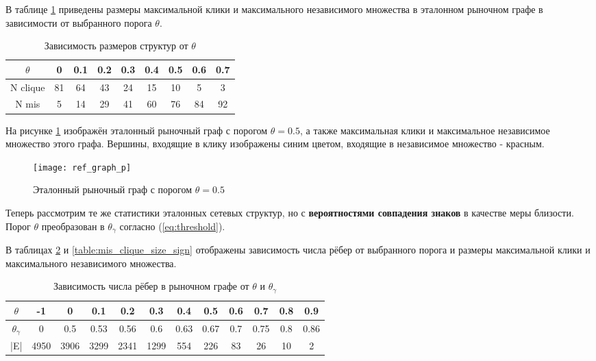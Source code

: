 В таблице \ref{table:mis_clique_size} приведены размеры максимальной клики и максимального независимого множества в эталонном рыночном графе в зависимости от выбранного порога $\theta$.

\begin{table}[h!]
\centering
\begin{tabular}{ |c|c|c|c|c|c|c|c|c| } 
 \hline
 $\theta$ & 0 & 0.1 & 0.2 & 0.3 & 0.4 & 0.5 & 0.6 & 0.7 \\ 
 \hline
 N clique & 81 & 64 & 43 & 24 & 15 & 10 & 5 & 3\\ 
 \hline
 N mis    & 5  & 14 & 29 & 41 & 60 & 76 & 84 & 92\\ 
 \hline
\end{tabular}
\caption{Зависимость размеров структур от $\theta$}
\label{table:mis_clique_size}
\end{table}

На рисунке \ref{fig:ref_graph_p} изображён эталонный рыночный граф с порогом $\theta=0.5$, а также максимальная клики и максимальное независимое множество этого графа. Вершины, входящие в клику изображены синим цветом, входящие в независимое множество - красным.

\begin{figure}[H]
\centering
\texttt{[image: ref\_graph\_p]}
\caption{Эталонный рыночный граф с порогом $\theta=0.5$}
\label{fig:ref_graph_p}
\end{figure}



Теперь рассмотрим те же статистики эталонных сетевых структур, но с\textbf{ вероятностями совпадения знаков} в качестве меры близости. Порог $\theta$ преобразован в $\theta_\gamma$ согласно (\ref{eq:threshold}). 

В таблицах \ref{table:mg_size_sign} и \ref{table:mis_clique_size_sign} отображены зависимость числа рёбер от выбранного порога и  размеры максимальной клики и максимального независимого множества.

\begin{table}[h!]
\centering
\begin{tabular}{ |c|c|c|c|c|c|c|c|c|c|c|c| } 
 \hline
 $\theta$ & -1 & 0 & 0.1 & 0.2 & 0.3 & 0.4 & 0.5 & 0.6 & 0.7 & 0.8 & 0.9 \\ 
 \hline
  $\theta_\gamma$ & 0 & 0.5 & 0.53 & 0.56 & 0.6 & 0.63 & 0.67 & 0.7 & 0.75 & 0.8 & 0.86 \\ 
 \hline
 |E|	  & 4950 & 3906 & 3299 & 2341 & 1299 & 554 & 226 & 83 & 26 & 10 & 2 \\ 
 \hline
\end{tabular}
\caption{Зависимость числа рёбер в рыночном графе от $\theta$ и $\theta_\gamma$}
\label{table:mg_size_sign}
\end{table}


